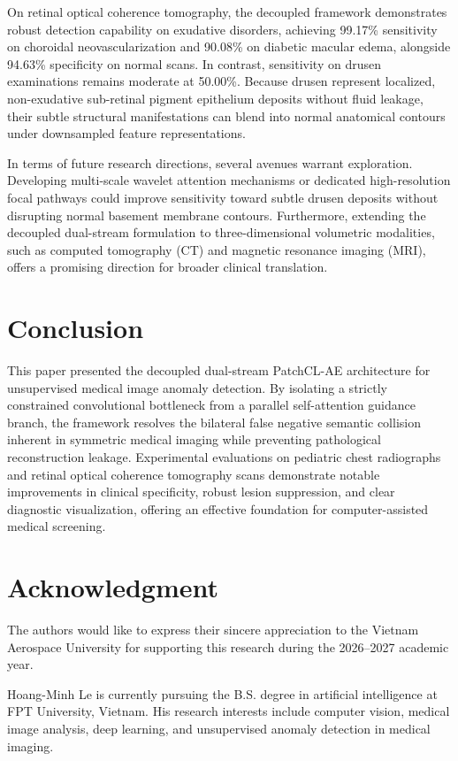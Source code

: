 \documentclass[journal]{IEEEtran}
\begin{document}
On retinal optical coherence tomography, the decoupled framework demonstrates robust detection capability on exudative disorders, achieving 99.17\% sensitivity on choroidal neovascularization and 90.08\% on diabetic macular edema, alongside 94.63\% specificity on normal scans. In contrast, sensitivity on drusen examinations remains moderate at 50.00\%. Because drusen represent localized, non-exudative sub-retinal pigment epithelium deposits without fluid leakage, their subtle structural manifestations can blend into normal anatomical contours under downsampled feature representations.

In terms of future research directions, several avenues warrant exploration. Developing multi-scale wavelet attention mechanisms or dedicated high-resolution focal pathways could improve sensitivity toward subtle drusen deposits without disrupting normal basement membrane contours. Furthermore, extending the decoupled dual-stream formulation to three-dimensional volumetric modalities, such as computed tomography (CT) and magnetic resonance imaging (MRI), offers a promising direction for broader clinical translation.

\section{Conclusion}
This paper presented the decoupled dual-stream PatchCL-AE architecture for unsupervised medical image anomaly detection. By isolating a strictly constrained convolutional bottleneck from a parallel self-attention guidance branch, the framework resolves the bilateral false negative semantic collision inherent in symmetric medical imaging while preventing pathological reconstruction leakage. Experimental evaluations on pediatric chest radiographs and retinal optical coherence tomography scans demonstrate notable improvements in clinical specificity, robust lesion suppression, and clear diagnostic visualization, offering an effective foundation for computer-assisted medical screening.

\section*{Acknowledgment}
The authors would like to express their sincere appreciation to the Vietnam Aerospace University for supporting this research during the 2026--2027 academic year.




\begin{IEEEbiographynophoto}{Hoang-Minh Le}
is currently pursuing the B.S. degree in artificial intelligence at FPT University, Vietnam. His research interests include computer vision, medical image analysis, deep learning, and unsupervised anomaly detection in medical imaging.
\end{IEEEbiographynophoto}
\end{document}
